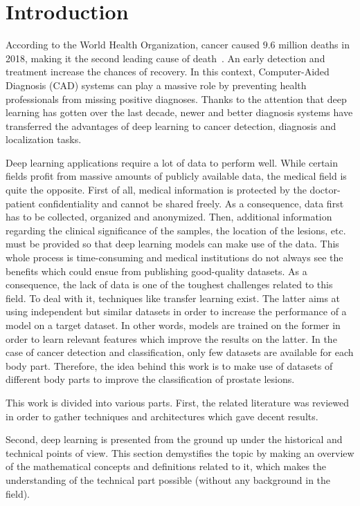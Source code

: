 
\chapter{Introduction}
\label{ch:introduction}
\setlength{\marginparwidth}{3cm}\leavevmode {}According to the World Health Organization, cancer caused $9.6$ million deaths in 2018, making it the second leading cause of death~\cite{44}. An early detection and treatment increase the chances of recovery. In this context, Computer-Aided Diagnosis (CAD) systems can play a massive role by preventing health professionals from missing positive diagnoses. Thanks to the attention that deep learning has gotten over the last decade, newer and better diagnosis systems have transferred the advantages of deep learning to cancer detection, diagnosis and localization tasks.

Deep learning applications require a lot of data to perform well. While certain fields profit from massive amounts of publicly available data, the medical field is quite the opposite. First of all, medical information is protected by the doctor-patient confidentiality and cannot be shared freely. As a consequence, data first has to be collected, organized and anonymized. Then, additional information regarding the clinical significance of the samples, the location of the lesions, etc. must be provided so that deep learning models can make use of the data. This whole process is time-consuming and medical institutions do not always see the benefits which could ensue from publishing good-quality datasets. As a consequence, the lack of data is one of the toughest challenges related to this field. To deal with it, techniques like transfer learning exist. The latter aims at using independent but similar datasets in order to increase the performance of a model on a target dataset. In other words, models are trained on the former in order to learn relevant features which improve the results on the latter. In the case of cancer detection and classification, only few datasets are available for each body part. Therefore, the idea behind this work is to make use of datasets of different body parts to improve the classification of prostate lesions.

This work is divided into various parts. First, the related literature was reviewed in order to gather techniques and architectures which gave decent results.

Second, deep learning is presented from the ground up under the historical and technical points of view. This section demystifies the topic by making an overview of the mathematical concepts and definitions related to it, which makes the understanding of the technical part possible (without any background in the field).

